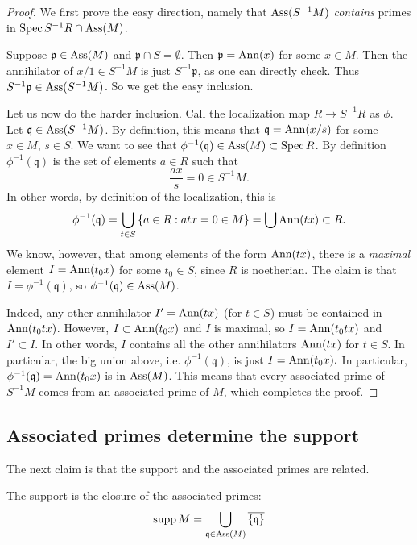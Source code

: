 \begin{proof} 
We first prove the easy direction, namely that $\operatorname{Ass}(S^{-1}M)$
\emph{contains} primes in $\operatorname{Spec} S^{-1}R \cap \operatorname{Ass}(M)$. 

Suppose $\mathfrak{p} \in \operatorname{Ass}(M)$ and
$\mathfrak{p} \cap S = \emptyset$. Then $\mathfrak{p} = \operatorname{Ann}(x)$ for some $x
\in M$. Then the annihilator of $x/1 \in S^{-1}M$ is just $S^{-1}\mathfrak{p}$, as one
can directly check. Thus $S^{-1}\mathfrak{p} \in \operatorname{Ass}(S^{-1}M)$.
So we get the easy inclusion.

Let us now do the harder inclusion.  
Call the localization map $R \to S^{-1}R  $ as $\phi$.
Let $\mathfrak{q} \in \operatorname{Ass}(S^{-1}M)$. By definition, this means that $\mathfrak{q} =
\operatorname{Ann}(x/s)$ for some $x \in M$, $s \in S$. We want to see that
$\phi^{-1}(\mathfrak{q}) \in \operatorname{Ass}(M) \subset \operatorname{Spec} R$.
By definition $\phi^{-1}(\mathfrak{q})$ is the set of elements $a \in R$ such that
\[ \frac{ax}{s} = 0 \in S^{-1}M . \]
In other words, by definition of the localization, this is 
\[  \phi^{-1}(\mathfrak{q}) = \bigcup_{t \in S} \left\{a \in R: atx = 0 \in M\right\} = \bigcup \operatorname{Ann}(tx)
\subset R.\]
We know, however, that among elements of the form $\operatorname{Ann}(tx)$, there is a
\emph{maximal} element $I=\operatorname{Ann}(t_0 x)$ for some $t_0 \in S$, since $R$ is
noetherian.  The claim is that $I = \phi^{-1}(\mathfrak{q})$, so
$\phi^{-1}(\mathfrak{q}) \in \operatorname{Ass}(M)$.

Indeed,  any other annihilator $I' = \operatorname{Ann}(tx)$ (for $t \in S$) must be contained in $\operatorname{Ann}(t_0 t x)$. However, 
\( I \subset \operatorname{Ann}(t_0 x)  \)
and $I$ is maximal, so $I = \operatorname{Ann}(t_0 t x)$ and
\( I' \subset I.  \) In other words, $I$ contains all the other annihilators
$\operatorname{Ann}(tx)$ for $t \in S$.
In particular, the big union above, i.e. $\phi^{-1}(\mathfrak{q})$, is just
\( I = \operatorname{Ann}(t_0 x).  \)
In particular, $\phi^{-1}(\mathfrak{q}) = \operatorname{Ann}(t_0x)$ is in $\operatorname{Ass}(M)$.
This means that every associated prime
of $S^{-1}M$ comes from an associated prime of $M$, which completes the proof.
\end{proof} 





\subsection{Associated primes determine the support}
The next claim is that the support and the associated primes are related.

\begin{proposition}\label{supportassociated} The support is the closure of the associated primes:
\[ \operatorname{supp} M  = \bigcup_{\mathfrak{q} \in \operatorname{Ass}(M)}
\overline{\left\{\mathfrak{q}\right\}} \]
\end{proposition} 

